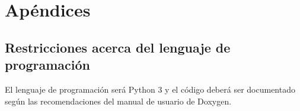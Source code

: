 \chapter{Apéndices}



\section{Restricciones acerca del lenguaje de programación}

El lenguaje de programación será Python 3 y el código deberá ser documentado según las recomendaciones del manual de usuario de Doxygen.